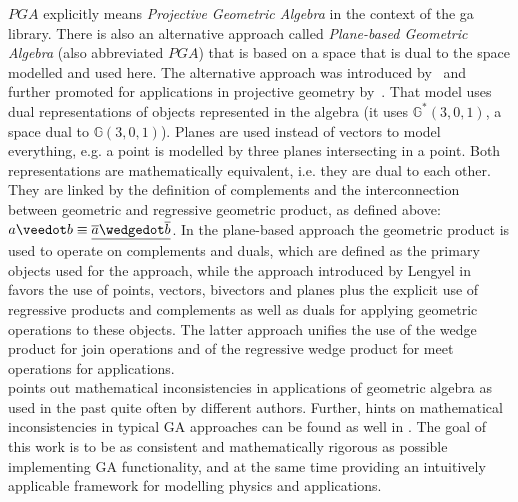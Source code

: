 $PGA$ explicitly means \emph{Projective Geometric Algebra} in the context of the ga
library. There is also an alternative approach called \emph{Plane-based Geometric Algebra}
(also abbreviated $PGA$) that is based on a space that is dual to the space modelled and
used here. The alternative approach was introduced by~\cite{Gunn_PGA:2020} and further
promoted for applications in projective geometry
by~\cite{Plane-based_PGA_Dorst-DeKennik:2022}. That model uses dual representations of
objects represented in the algebra (it uses $\mathbb{G}^*(3,0,1)$, a space dual to
$\mathbb{G}(3,0,1)$). Planes are used instead of vectors to model everything, e.g. a point
is modelled by three planes intersecting in a point. Both representations are
mathematically equivalent, i.e. they are dual to each other. They are linked by the
definition of complements and the interconnection between geometric and regressive
geometric product, as defined above: $a \veedot b \equiv \lcmpl{\rcmpl{a} \wedgedot
\rcmpl{b}}$. In the plane-based approach the geometric product is used to operate on
complements and duals, which are defined as the primary objects used for the approach,
while the approach introduced by Lengyel in~\cite{Lengyel_pga-illuminated:2024} favors the
use of points, vectors, bivectors and planes plus the explicit use of regressive products
and complements as well as duals for applying geometric operations to these objects. The
latter approach unifies the use of the wedge product for join operations and of the
regressive wedge product for meet operations for applications. \\

\cite{Lengyel_poor-foundations_GA:2024} points out mathematical inconsistencies in
applications of geometric algebra as used in the past quite often by different authors.
Further, hints on mathematical inconsistencies in typical GA approaches can be found as
well in \cite{Kritchevsky_case_against_GA:2024}. The goal of this work is to be as
consistent and mathematically rigorous as possible implementing GA functionality, and at
the same time providing an intuitively applicable framework for modelling physics and
applications. \\

\newpage
